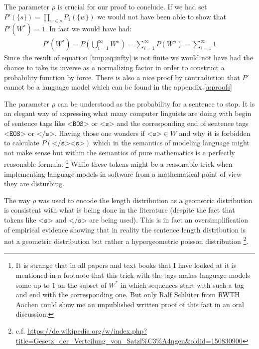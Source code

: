 \documentclass[•]{book}
\begin{document}
\begin{remark}
The parameter $\rho$ is crucial for our proof to conclude.
If we had set $P'(\{s\}) = \prod_{w\in s}P_1(\{w\})$ we would not have been able to show that $P'(W^{*})=1$. 
In fact we would have had:
\begin{align}
P'(W^{*})= P(\bigcup_{i=1}^\infty W^n) = \sum_{i=1}^\infty P(W^n) = \sum_{i=1}^\infty 1 \label{tmp:eq:infty}
\end{align}
Since the result of equation \ref{tmp:eq:infty} is not finite we would not have had the chance to take its inverse as a normalizing factor in order to construct a probability function by force. 
There is also a nice proof by contradiction that $P'$ cannot be a language model which can be found in the appendix \ref{a:proofs}
\end{remark}

\begin{remark}
The parameter $\rho$ can be understood as the probability for a sentence to stop. 
It is an elegant way of expressing what many computer linguists are doing with begin of sentence tags like $\texttt{<BOS>}$ or $\texttt{<s>}$ and the corresponding end of sentence tags $\texttt{<EOS>}$ or $\texttt{</s>}$.
Having those one wonders if $\texttt{<s>}\in W$ and why it is forbidden to calculate $P(\texttt{</s><s>})$ which in the semantics of modeling language might not make sense but within the semantics of pure mathematics is a perfectly reasonable formula. \footnote{It is strange that in all papers and text books that I have looked at it is mentioned in a footnote that this trick with the tags makes language models some up to $1$ on the subset of $W^{*}$ in which sequences start with such a tag and end with the corresponding one. But only Ralf Schl\"uter from RWTH Aachen could show me an unpublished written proof of this fact in an oral discussion.} While these tokens might be a reasonable trick when implementing language models in software from a mathematical point of view they are disturbing.
\end{remark}

\begin{remark}
The way $\rho$ was used to encode the length distribution as a geometric distribution is consistent with what is being done in the literature (despite the fact that tokens like $\texttt{<s>}$ and $\texttt{</s>}$ are being used). This is in fact an oversimplification of empirical evidence showing that in reality the sentence length distribution is not a geometric distribution but rather a hypergeometric poisson distribution \footnote{c.f. \url{https://de.wikipedia.org/w/index.php?title=Gesetz_der_Verteilung_von_Satzl\%C3\%A4ngen&oldid=150830900}}.
\end{remark}
\end{document}
